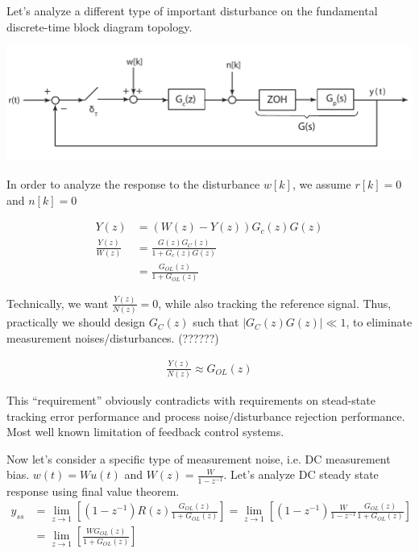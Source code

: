 \documentclass[twoside]{article}
\begin{document}
Let's analyze a different type of important disturbance on the fundamental 
discrete-time block diagram topology. 

\begin{center}
\begin{minipage}[h]{\linewidth}
    \begin{center}
      \includegraphics[width=\textwidth]{noise}
    \end{center}
\end{minipage}
\end{center}

In order to analyze the response to the disturbance $w[k]$, we assume 
$r[k] = 0$ and $n[k] = 0$ 

\begin{align*}
Y(z) &= ( W(z) -Y(z) ) G_c(z) G(z)
\\
\frac{Y(z)}{W(z)} &= \frac{G(z) G_C(z)}{1 + G_c(z) G(z)}
\\
&= \frac{G_{OL} (z)}{1 + G_{OL}(z)}
\end{align*}

Technically, we want $\frac{Y(z)}{N(z)} = 0$, while also tracking
the reference signal. Thus, practically we should design $G_C(z)$ such
that $|G_C(z) G(z)| \ll 1$, to eliminate measurement
noises/disturbances. (??????) 

\begin{align*}
\frac{Y(z)}{N(z)} \approx {G_{OL}(z)}
\end{align*}

This ``requirement'' obviously contradicts with 
requirements on stead-state tracking error performance
and process noise/disturbance rejection performance. Most well
known limitation of feedback control systems.

Now let's consider a specific type of measurement noise, i.e. DC measurement bias.  
$w(t) = W u(t)$ and $W(z) = \frac{W}{1 - z^{-1}}$. Let's
analyze DC steady state response using final value theorem.
%
\begin{align*}
y_{ss} &= \lim_{z\to1} \left[ (1 - z^{-1}) R(z) \frac{ G_{OL}(z) } {
  1 + G_{OL}(z) } \right] = \lim_{z\to1} \left[ (1 - z^{-1}) \frac{W}{1-z^{-1}} \frac{ G_{OL}(z) } {
  1 + G_{OL}(z) } \right]  
\\
&= \lim_{z\to1} \left[ \frac{ W G_{OL}(z) }{1 + G_{OL}(z) } \right]  
\end{align*}
\end{document}
